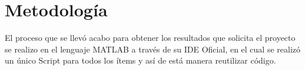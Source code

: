 \section{Metodología}\label{metodologia}
El proceso que se llevó acabo para obtener los resultados que solicita el proyecto se realizo  en el lenguaje MATLAB a través de su IDE Oficial, en el cual se realizó un único Script para todos los ítems y así de está manera reutilizar código.





